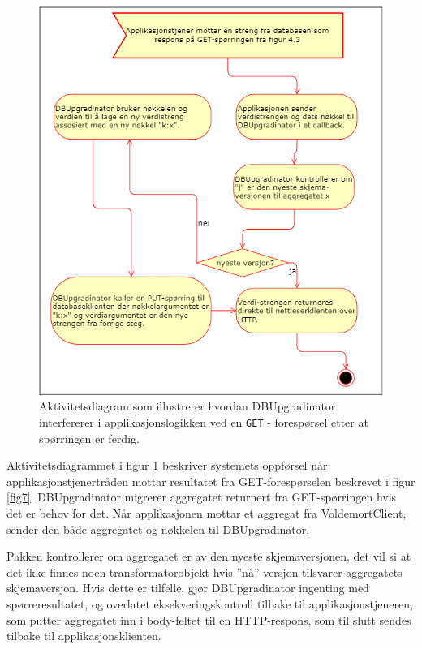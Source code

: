 \begin{figure}[hbtp]
    \centering
    \includegraphics[scale=0.5]{fig/dbupgradinator-prosess-2.png}
    \caption{Aktivitetsdiagram som illustrerer hvordan DBUpgradinator interfererer i applikasjonslogikken ved en \texttt{GET} - forespørsel etter at spørringen er ferdig.}
    \label{fig8}
\end{figure}

Aktivitetsdiagrammet i figur \ref{fig8} beskriver systemets oppførsel når applikasjons\-tjener\-tråden mottar resultatet fra GET-forespørselen beskrevet i figur \ref{fig7}. DBUpgradinator migrerer aggregatet returnert fra GET-spørringen hvis det er behov for det. Når applikasjonen mottar et aggregat fra VoldemortClient, sender den både aggregatet og nøkkelen til DBUpgradinator.

Pakken kontrollerer om aggregatet er av den nyeste skjemaversjonen, det vil si at det ikke finnes noen transformatorobjekt hvis ''nå''-versjon tilsvarer aggregatets skjemaversjon. Hvis dette er tilfelle, gjør DBUpgradinator ingenting med spørreresultatet, og overlatet eksekveringskontroll tilbake til applikasjonstjeneren, som putter aggregatet inn i body-feltet til en HTTP-respons, som til slutt sendes tilbake til applikasjonsklienten.

